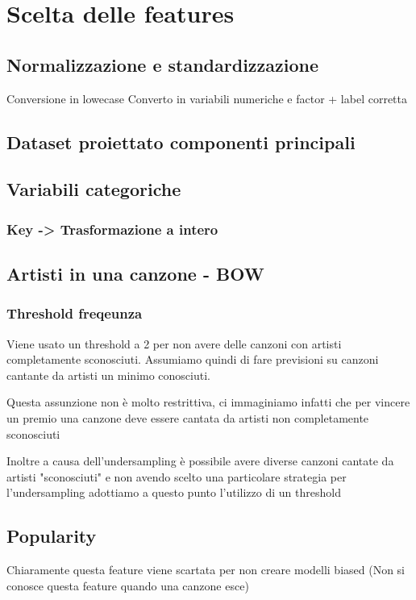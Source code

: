 \section{Scelta delle features}
\subsection{Normalizzazione e standardizzazione}
Conversione in lowecase
Converto in variabili numeriche e factor + label corretta
\subsection{Dataset proiettato componenti principali}
\subsection{Variabili categoriche}
\subsubsection{Key -> Trasformazione a intero}
\subsection{Artisti in una canzone - BOW}
\subsubsection{Threshold freqeunza}
Viene usato un threshold a 2 per non avere delle canzoni con artisti completamente sconosciuti. Assumiamo quindi di fare previsioni su canzoni cantante da artisti un minimo conosciuti.

Questa assunzione non è molto restrittiva, ci immaginiamo infatti che per vincere un premio una canzone deve essere cantata da artisti non completamente sconosciuti

Inoltre a causa dell'undersampling è possibile avere diverse canzoni cantate da artisti "sconosciuti" e non avendo scelto una particolare strategia per l'undersampling adottiamo a questo punto l'utilizzo di un threshold

\subsection{Popularity}
Chiaramente questa feature viene scartata per non creare modelli biased (Non si conosce questa feature quando una canzone esce)
